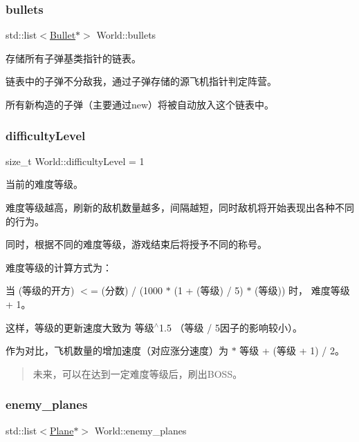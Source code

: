 \subsubsection{\texorpdfstring{bullets}{bullets}}
{\footnotesize\ttfamily std\+::list$<$\hyperlink{class_bullet}{Bullet}$\ast$$>$ World\+::bullets}



存储所有子弹基类指针的链表。 

链表中的子弹不分敌我，通过子弹存储的源飞机指针判定阵营。

所有新构造的子弹（主要通过new）将被自动放入这个链表中。 \mbox{\label{class_world_a594e81a86f319eea4e8e5a2029cdaa90}} 
\subsubsection{\texorpdfstring{difficulty\+Level}{difficultyLevel}}
{\footnotesize\ttfamily size\+\_\+t World\+::difficulty\+Level = 1}



当前的难度等级。 

难度等级越高，刷新的敌机数量越多，间隔越短，同时敌机将开始表现出各种不同的行为。

同时，根据不同的难度等级，游戏结束后将授予不同的称号。

难度等级的计算方式为：
\begin{DoxyItemize}
\item 当 {\ttfamily (等级的开方) $<$= (分数) / (1000 $\ast$ (1 + (等级) / 5) $\ast$ (等级))} 时， 难度等级 + 1。
\item 这样，等级的更新速度大致为 {\ttfamily 等级$^\wedge$1.5} （{\ttfamily 等级 / 5}因子的影响较小）。
\item 作为对比，飞机数量的增加速度（对应涨分速度）为 { $\ast$ 等级 + (等级 + 1) / 2}。
\end{DoxyItemize}

\begin{quote}
未来，可以在达到一定难度等级后，刷出\+B\+O\+S\+S。 \end{quote}
\mbox{\label{class_world_a9692ac6798300e7fde98eb3ef1bb7c79}} 
\subsubsection{\texorpdfstring{enemy\+\_\+planes}{enemy\_planes}}
{\footnotesize\ttfamily std\+::list$<$\hyperlink{class_plane}{Plane}$\ast$$>$ World\+::enemy\+\_\+planes}



